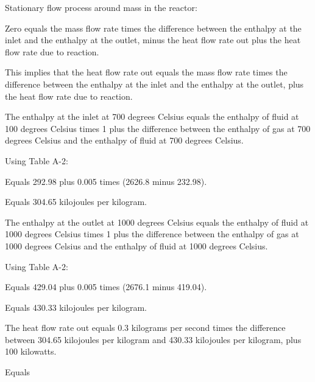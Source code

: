 Stationary flow process around mass in the reactor:

Zero equals the mass flow rate times the difference between the enthalpy at the inlet and the enthalpy at the outlet, minus the heat flow rate out plus the heat flow rate due to reaction.

This implies that the heat flow rate out equals the mass flow rate times the difference between the enthalpy at the inlet and the enthalpy at the outlet, plus the heat flow rate due to reaction.

The enthalpy at the inlet at 700 degrees Celsius equals the enthalpy of fluid at 100 degrees Celsius times 1 plus the difference between the enthalpy of gas at 700 degrees Celsius and the enthalpy of fluid at 700 degrees Celsius.

Using Table A-2:

Equals 292.98 plus 0.005 times (2626.8 minus 232.98).

Equals 304.65 kilojoules per kilogram.

The enthalpy at the outlet at 1000 degrees Celsius equals the enthalpy of fluid at 1000 degrees Celsius times 1 plus the difference between the enthalpy of gas at 1000 degrees Celsius and the enthalpy of fluid at 1000 degrees Celsius.

Using Table A-2:

Equals 429.04 plus 0.005 times (2676.1 minus 419.04).

Equals 430.33 kilojoules per kilogram.

The heat flow rate out equals 0.3 kilograms per second times the difference between 304.65 kilojoules per kilogram and 430.33 kilojoules per kilogram, plus 100 kilowatts.

Equals
